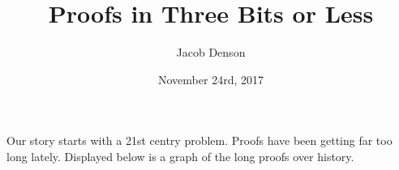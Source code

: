 \documentclass{article}
\title{Proofs in Three Bits or Less}
\author{Jacob Denson}
\date{November 24rd, 2017}
\theoremstyle{plain}
\theoremstyle{definition}
\begin{document}
\maketitle

Our story starts with a 21st centry problem. Proofs have been getting far too long lately. Displayed below is a graph of the long proofs over history.
%
\end{document}
